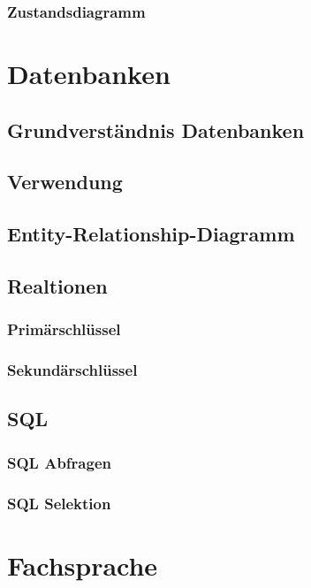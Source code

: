 \documentclass[12pt,a4paper]{article}
\begin{document}
\subsubsection{Zustandsdiagramm}
\section{Datenbanken}
\subsection{Grundverständnis Datenbanken}
\subsection{Verwendung}
\subsection{Entity-Relationship-Diagramm}
\subsection{Realtionen}
\subsubsection{Primärschlüssel}
\subsubsection{Sekundärschlüssel}
\subsection{SQL}
\subsubsection{SQL Abfragen}
\subsubsection{SQL Selektion}
\section{Fachsprache}
\end{document}
